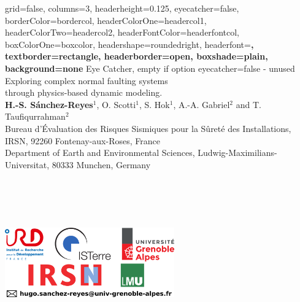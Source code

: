 


	

\color{standardfontcolor}

\begin{poster}{
		grid=false,
		columns=3,
		headerheight=0.125\textheight,
		eyecatcher=false,
        borderColor=bordercol,
		headerColorOne=headercol1,
		headerColorTwo=headercol2,
		headerFontColor=headerfontcol,
		boxColorOne=boxcolor,
		headershape=roundedright,
		headerfont=\sffamily\bfseries\Large,
		textborder=rectangle,
		headerborder=open,
		boxshade=plain,
		background=none
	}
	{
		Eye Catcher, empty if option eyecatcher=false - unused
	}
%
{
	\textsf %
	{\vskip 2.0cm Exploring complex normal faulting systems \\ through physics-based dynamic modeling.}
}
{\sf\vspace{-0.1em}\\
	{\textbf{H.-S. S\'anchez-Reyes$^1$}, O. Scotti$^1$, S. Hok$^1$, A.-A. Gabriel$^2$ and T. Taufiqurrahman$^2$}
	\vspace{0.2em}\\
	\normalsize{Bureau d’Évaluation des Risques Sismiques pour la Sûreté des Installations, IRSN, 92260 Fontenay-aux-Roses, France
	\vspace{0.1em}\\
	Department of Earth and Environmental Sciences, Ludwig-Maximilians-Universitat, 80333 Munchen, Germany	 	
	} \\ \\ \\ \\ \\ 
}
{ \begin{minipage}{2cm}
  \vskip 0.2cm \hskip -5cm \includegraphics[width=7.3cm]{../../logos/logo_poster_2022.png} \\
 \end{minipage}
 }


\end{poster}
